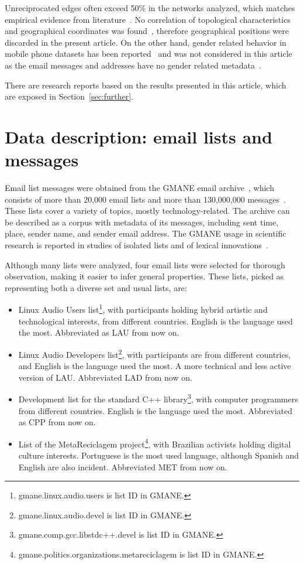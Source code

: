 \documentclass[%
 aip,
 jmp,%
 amsmath,amssymb,
 reprint,%
]{revtex4-1}
\begin{document}
Unreciprocated edges often exceed 50\% in the networks analyzed, which matches empirical evidence from literature~\cite{newmanEvolving}. No correlation of topological characteristics and geographical coordinates was found~\cite{barabasiGeo}, therefore geographical positions were discarded in the present article.
On the other hand, gender related behavior in mobile phone datasets has been reported~\cite{barabasiSex} and was not considered in this article as the email messages and addresses have no gender related metadata~\cite{GMANE}.

There are research reports based on the results presented in this article, which are exposed in Section~\ref{sec:further}.

\section{Data description: email lists and messages}\label{sec:data}

Email list messages were obtained from
the GMANE email archive~\cite{GMANE}, which consists of more than 20,000 email lists and more than 130,000,000 messages~\cite{GMANEwikipedia}. These lists cover a variety of topics, mostly technology-related. The archive can be described as a corpus with metadata of its messages, including sent time, place, sender name, and sender email address.
The GMANE usage in scientific research is reported in studies of isolated lists and of lexical innovations~\cite{GMANE2,bird}. 

Although many lists were analyzed, four email lists were selected for thorough observation, making it easier to infer general properties. These lists, picked as representing both a diverse set and usual lists, are:
\begin{itemize}
    \item Linux Audio Users list\footnote{gmane.linux.audio.users is list ID in GMANE.}, with participants holding hybrid artistic and technological interests, from different countries. English is the language used the most. Abbreviated as LAU from now on.
    \item Linux Audio Developers list\footnote{gmane.linux.audio.devel is list ID in GMANE.}, with participants are from different countries, and English is the language used the most. A more technical and less active version of LAU. Abbreviated LAD from now on.
    \item Development list for the standard C++ library\footnote{gmane.comp.gcc.libstdc++.devel is list ID in GMANE.}, with computer programmers from different countries. English is the language used the most. Abbreviated as CPP from now on.
    \item List of the MetaReciclagem project\footnote{gmane.politics.organizations.metareciclagem is list ID in GMANE.}, with Brazilian activists holding digital culture interests. Portuguese is the most used language, although Spanish and English are also incident. Abbreviated MET from now on.
\end{itemize} 
\end{document}
